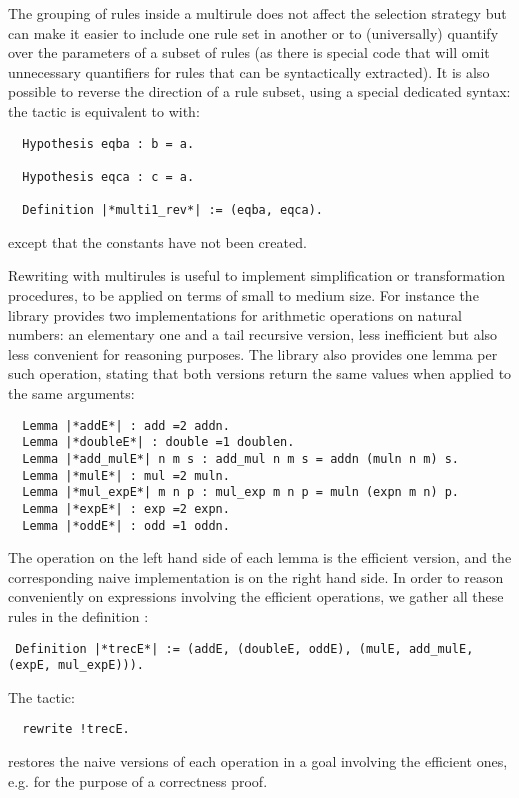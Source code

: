 The grouping of rules inside a multirule does not affect the selection
strategy but can make it easier to include one rule set in another or
to (universally) quantify over the parameters of a subset of rules (as
there is special code that will omit unnecessary quantifiers for rules that
can be syntactically extracted). It is also possible to
reverse the direction of a rule subset, using a special dedicated syntax:
the tactic  is equivalent to
 with:
\begin{lstlisting}
  Hypothesis eqba : b = a.

  Hypothesis eqca : c = a.

  Definition |*multi1_rev*| := (eqba, eqca).
\end{lstlisting}
except that the constants  have not been created.

Rewriting with multirules
is useful to implement simplification or transformation
procedures, to be applied on terms of small to medium size. For
instance the library  provides two implementations for
arithmetic operations on natural numbers: an elementary one and a tail
recursive version, less inefficient but also less convenient for
reasoning purposes. The library also provides one lemma per such
operation, stating that both versions return the same values when
applied to the same arguments:

\begin{lstlisting}
  Lemma |*addE*| : add =2 addn.
  Lemma |*doubleE*| : double =1 doublen.
  Lemma |*add_mulE*| n m s : add_mul n m s = addn (muln n m) s.
  Lemma |*mulE*| : mul =2 muln.
  Lemma |*mul_expE*| m n p : mul_exp m n p = muln (expn m n) p.
  Lemma |*expE*| : exp =2 expn.
  Lemma |*oddE*| : odd =1 oddn.
\end{lstlisting}

The operation on the left hand side of each lemma is the efficient
version, and the corresponding naive implementation is on the right
hand side. In order to reason conveniently on expressions involving
the efficient operations, we gather all these rules in the
definition :
\begin{lstlisting}
 Definition |*trecE*| := (addE, (doubleE, oddE), (mulE, add_mulE, (expE, mul_expE))).
\end{lstlisting}
The tactic:
\begin{lstlisting}
  rewrite !trecE.
\end{lstlisting}
restores the naive versions of each operation in a goal involving the
efficient ones, e.g. for the purpose of a correctness proof.

